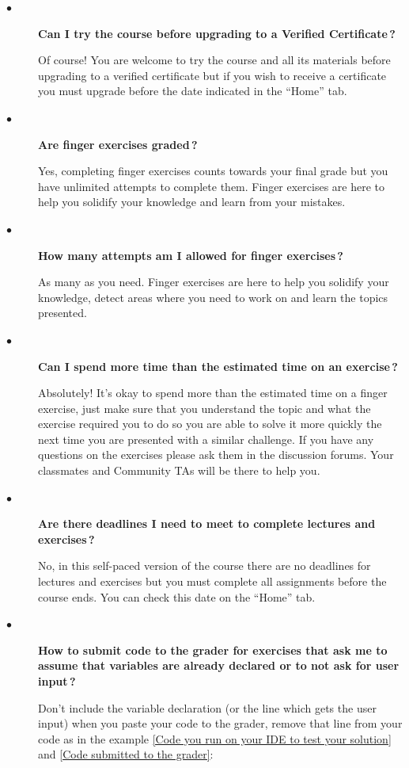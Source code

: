 \documentclass{article}
\newcommand{\question}[1]{\item[$\bullet$] 
	\begin{minipage}[t]{\textwidth}
		\bfseries#1
	\end{minipage}
	\hfil
}
\newenvironment{answer}{}{}
\newenvironment{faq}{\begin{description}}{\end{description}}
\begin{document}
	\begin{faq}
		\question{Can I try the course before upgrading to a Verified Certificate\,?}
		\begin{answer}
			Of course! You are welcome to try the course and all its materials before
			upgrading to a verified certificate but if you wish to receive a certificate you
			must upgrade before the date indicated in the ``Home'' tab.
		\end{answer}
		
		\question{Are finger exercises graded\,?}
		\begin{answer}
			Yes, completing finger exercises counts towards your final grade but you
			have unlimited attempts to complete them. Finger exercises are here to help
			you solidify your knowledge and learn from your mistakes.
		\end{answer}
		
		\question{How many attempts am I allowed for finger exercises\,?}
		\begin{answer}
			As many as you need. Finger exercises are here to help you solidify your
			knowledge, detect areas where you need to work on and learn the topics
			presented.
		\end{answer}
		
		\question{Can I spend more time than the estimated time on an exercise\,?}
		\begin{answer}
			Absolutely! It’s okay to spend more than the estimated time on a finger
			exercise, just make sure that you understand the topic and what the exercise
			required you to do so you are able to solve it more quickly the next time you
			are presented with a similar challenge. If you have any questions on the
			exercises please ask them in the discussion forums. Your classmates and
			Community TAs will be there to help you.
		\end{answer}
		
		\question{Are there deadlines I need to meet to complete lectures and exercises\,?}
		\begin{answer}
			No, in this self-paced version of the course there are no deadlines for lectures
			and exercises but you must complete all assignments before the course
			ends. You can check this date on the ``Home'' tab.
		\end{answer}
		
		\question{How to submit code to the grader for exercises that ask me to \textcolor[HTML]{900090}{assume that variables are already declared} or \textcolor[HTML]{900090}{to not ask for user input}\,?}
		\begin{answer}
			Don't include the variable declaration (or the line which gets the user input) when you paste your code to the
			grader, remove that line from your code as in the example \textcolor{blue}{\ref{Code you run on your IDE to test your solution}} and \textcolor{blue}{\ref{Code submitted to the grader}}:
			

\end{answer}
\end{faq}
\end{document}
